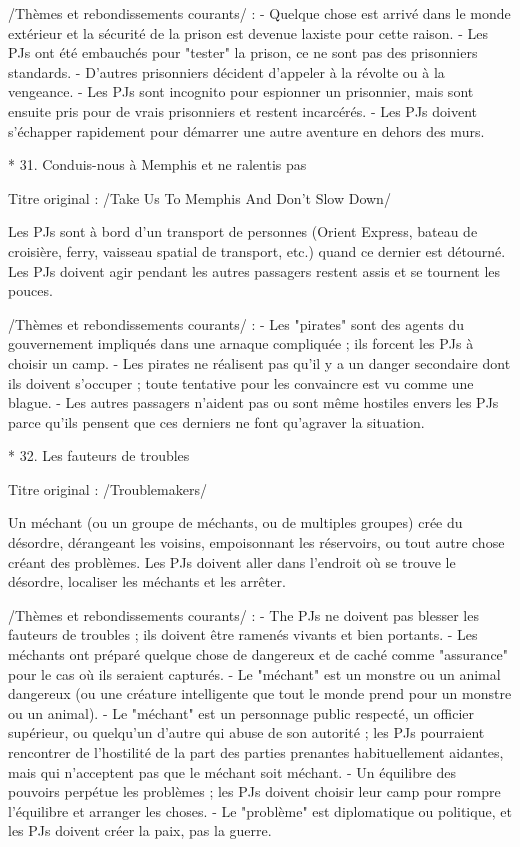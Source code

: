 \begin{enumerate}
/Thèmes et rebondissements courants/ :
- Quelque chose est arrivé dans le monde extérieur et la sécurité de la prison est devenue laxiste pour cette raison.
- Les PJs ont été embauchés pour "tester" la prison, ce ne sont pas des prisonniers standards.
- D'autres prisonniers décident d'appeler à la révolte ou à la vengeance.
- Les PJs sont incognito pour espionner un prisonnier, mais sont ensuite pris pour de vrais prisonniers et restent incarcérés.
- Les PJs doivent s'échapper rapidement pour démarrer une autre aventure en dehors des murs.

* 31. Conduis-nous à Memphis et ne ralentis pas

Titre original : /Take Us To Memphis And Don't Slow Down/

Les PJs sont à bord d'un transport de personnes (Orient Express, bateau de croisière, ferry, vaisseau spatial de transport, etc.) quand ce dernier est détourné. Les PJs doivent agir pendant les autres passagers restent assis et se tournent les pouces.

/Thèmes et rebondissements courants/ :
- Les "pirates" sont des agents du gouvernement impliqués dans une arnaque compliquée ; ils forcent les PJs à choisir un camp.
- Les pirates ne réalisent pas qu'il y a un danger secondaire dont ils doivent s'occuper ; toute tentative pour les convaincre est vu comme une blague.
- Les autres passagers n'aident pas ou sont même hostiles envers les PJs parce qu'ils pensent que ces derniers ne font qu'agraver la situation.

* 32. Les fauteurs de troubles

Titre original : /Troublemakers/

Un méchant (ou un groupe de méchants, ou de multiples groupes) crée du désordre, dérangeant les voisins, empoisonnant les réservoirs, ou tout autre chose créant des problèmes. Les PJs doivent aller dans l'endroit où se trouve le désordre, localiser les méchants et les arrêter.

/Thèmes et rebondissements courants/ :
- The PJs ne doivent pas blesser les fauteurs de troubles ; ils doivent être ramenés vivants et bien portants.
- Les méchants ont préparé quelque chose de dangereux et de caché comme "assurance" pour le cas où ils seraient capturés.
- Le "méchant" est un monstre ou un animal dangereux (ou une créature intelligente que tout le monde prend pour un monstre ou un animal).
- Le "méchant" est un personnage public respecté, un officier supérieur, ou quelqu'un d'autre qui abuse de son autorité ; les PJs pourraient rencontrer de l'hostilité de la part des parties prenantes habituellement aidantes, mais qui n'acceptent pas que le méchant soit méchant.
- Un équilibre des pouvoirs perpétue les problèmes ; les PJs doivent choisir leur camp pour rompre l'équilibre et arranger les choses.
- Le "problème" est diplomatique ou politique, et les PJs doivent créer la paix, pas la guerre.


\end{enumerate}
